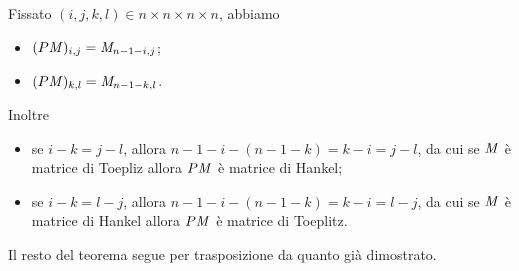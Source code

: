 \Proof Fissato $(i,j,k,l) \in n \times n \times n \times n$, abbiamo
\begin{itemize}
	\item $(P \mathit{M})_{i,j} = \mathit{M}_{n - 1 - i,j}$;
	\item $(P \mathit{M})_{k,l} = \mathit{M}_{n - 1 - k,l}$.
\end{itemize}
\par Inoltre
\begin{itemize}
	\item se $i - k = j - l$, allora $n - 1 - i - (n - 1 - k) = k - i = j - l$, da cui se $\mathit{M}$ \`e matrice di Toepliz allora $P \mathit{M}$ \`e matrice di Hankel;
	\item se $i - k = l - j$, allora $n - 1 - i - (n - 1 - k) = k - i = l - j$, da cui se $\mathit{M}$ \`e matrice di Hankel allora $P \mathit{M}$ \`e matrice di Toeplitz.
\end{itemize}
\par Il resto del teorema segue per trasposizione da quanto gi\`a dimostrato. \EndProof
